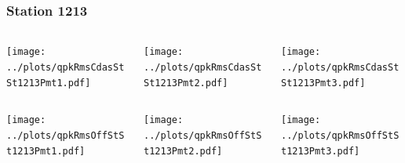 \documentclass[aspectratio=169]{beamer}
\begin{document}
\begin{frame} 
  \frametitle{Station 1213}
  \begin{center}
    \begin{columns}
      \begin{column}{0.33\textwidth}
        \texttt{[image: ../plots/qpkRmsCdasStSt1213Pmt1.pdf]}
      \end{column}
      \begin{column}{0.33\textwidth}
        \texttt{[image: ../plots/qpkRmsCdasStSt1213Pmt2.pdf]}
      \end{column}
      \begin{column}{0.33\textwidth}
        \texttt{[image: ../plots/qpkRmsCdasStSt1213Pmt3.pdf]}
      \end{column}
    \end{columns}
  \end{center}

  \begin{center}
    \begin{columns}
      \begin{column}{0.33\textwidth}
        \texttt{[image: ../plots/qpkRmsOffStSt1213Pmt1.pdf]}
      \end{column}
      \begin{column}{0.33\textwidth}
        \texttt{[image: ../plots/qpkRmsOffStSt1213Pmt2.pdf]}
      \end{column}
      \begin{column}{0.33\textwidth}
        \texttt{[image: ../plots/qpkRmsOffStSt1213Pmt3.pdf]}
      \end{column}
    \end{columns}
  \end{center}
\end{frame}
\end{document}
